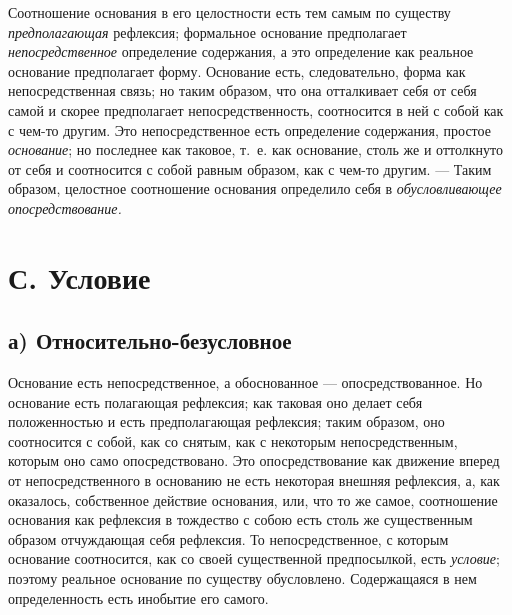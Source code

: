 Соотношение основания в его целостности есть тем самым по существу
{\em предполагающая} рефлексия; формальное основание
предполагает {\em непосредственное} определение
содержания, а это определение как реальное основание предполагает форму.
Основание есть, следовательно, форма как непосредственная связь; но таким
образом, что она отталкивает себя от себя самой и скорее предполагает
непосредственность, соотносится в ней с собой как с чем-то другим. Это
непосредственное есть определение содержания, простое
{\em основание}; но последнее как таковое, т.~е. как
основание, столь же и оттолкнуто от себя и соотносится с собой равным
образом, как с чем-то другим. — Таким образом, целостное соотношение
основания определило себя в {\em обусловливающее
опосредствование.}


\section[С. Условие]{С. Условие}
\subsection[а) Относительно-безусловное]{а) Относительно-безусловное}

Основание есть непосредственное, а обоснованное
— опосредствованное. Но основание есть полагающая рефлексия; как таковая
оно делает себя положенностью и есть предполагающая рефлексия; таким
образом, оно соотносится с собой, как со снятым, как с некоторым
непосредственным, которым оно само опосредствовано. Это опосредствование
как движение вперед от непосредственного в основанию не есть некоторая
внешняя рефлексия, а, как оказалось, собственное действие основания, или,
что то же самое, соотношение основания как рефлексия в тождество с собою
есть столь же существенным образом отчуждающая себя рефлексия. То
непосредственное, с которым основание соотносится, как со своей
существенной предпосылкой, есть {\em условие}; поэтому
реальное основание по существу обусловлено. Содержащаяся в нем
определенность есть инобытие его самого.

